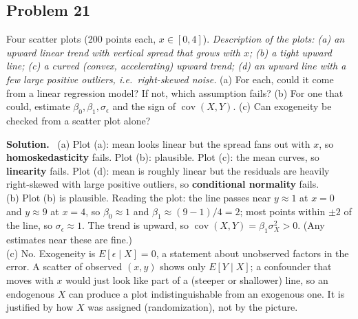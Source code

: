 \documentclass[11pt]{article}
\newenvironment{soln}{\par\smallskip\noindent\textbf{Solution.}\ }{\par\medskip}
\begin{document}
\subsection*{Problem 21}
Four scatter plots (200 points each, $x\in[0,4]$). \emph{Description of the plots: (a) an upward linear trend with vertical spread that grows with $x$; (b) a tight upward line; (c) a curved (convex, accelerating) upward trend; (d) an upward line with a few large positive outliers, i.e.\ right-skewed noise.}
(a) For each, could it come from a linear regression model? If not, which assumption fails? (b) For one that could, estimate $\beta_0,\beta_1,\sigma_\epsilon$ and the sign of $\operatorname{cov}(X,Y)$. (c) Can exogeneity be checked from a scatter plot alone?
\begin{soln}
(a) Plot (a): mean looks linear but the spread fans out with $x$, so \textbf{homoskedasticity} fails. Plot (b): plausible. Plot (c): the mean curves, so \textbf{linearity} fails. Plot (d): mean is roughly linear but the residuals are heavily right-skewed with large positive outliers, so \textbf{conditional normality} fails.\\
(b) Plot (b) is plausible. Reading the plot: the line passes near $y\approx1$ at $x=0$ and $y\approx9$ at $x=4$, so $\beta_0\approx1$ and $\beta_1\approx(9-1)/4=2$; most points within $\pm2$ of the line, so $\sigma_\epsilon\approx1$. The trend is upward, so $\operatorname{cov}(X,Y)=\beta_1\sigma_X^2>0$. (Any estimates near these are fine.)\\
(c) No. Exogeneity is $E[\epsilon\mid X]=0$, a statement about unobserved factors in the error. A scatter of observed $(x,y)$ shows only $E[Y\mid X]$; a confounder that moves with $x$ would just look like part of a (steeper or shallower) line, so an endogenous $X$ can produce a plot indistinguishable from an exogenous one. It is justified by how $X$ was assigned (randomization), not by the picture.
\end{soln}
\end{document}
